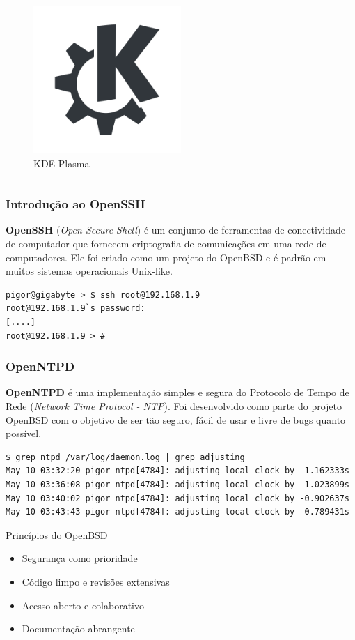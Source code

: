 \documentclass[9pt,xcolor=table]{beamer}
\begin{document}
\begin{frame}
\begin{columns}
\begin{column}{0.3\textwidth}
\begin{figure}
\centering
\includegraphics[width=0.5\textwidth]{imagens/kde-logo.png}
\caption{KDE Plasma}
\end{figure}
\end{column}
\end{columns}
\end{frame}
\begin{frame}[fragile]
\frametitle{Introdução ao OpenSSH}
\textbf{OpenSSH} (\textit{Open Secure Shell}) é um conjunto de ferramentas de conectividade de computador que fornecem criptografia de comunicações em uma rede de computadores. Ele foi criado como um projeto do OpenBSD e é padrão em muitos sistemas operacionais Unix-like.
\vspace{0.5cm}
\begin{lstlisting}
pigor@gigabyte > $ ssh root@192.168.1.9
root@192.168.1.9`s password:
[....]
root@192.168.1.9 > #
\end{lstlisting}
\end{frame}
\begin{frame}[fragile]
\frametitle{OpenNTPD}
\justifying
\textbf{OpenNTPD} é uma implementação simples e segura do Protocolo de Tempo de Rede (\textit{Network Time Protocol - NTP}). Foi desenvolvido como parte do projeto OpenBSD com o objetivo de ser tão seguro, fácil de usar e livre de bugs quanto possível.
\vspace{0.5cm}
\begin{lstlisting}
$ grep ntpd /var/log/daemon.log | grep adjusting
May 10 03:32:20 pigor ntpd[4784]: adjusting local clock by -1.162333s
May 10 03:36:08 pigor ntpd[4784]: adjusting local clock by -1.023899s
May 10 03:40:02 pigor ntpd[4784]: adjusting local clock by -0.902637s
May 10 03:43:43 pigor ntpd[4784]: adjusting local clock by -0.789431s
\end{lstlisting}
\end{frame}
\begin{frame}{Princípios do OpenBSD}
  \begin{itemize}
    \item Segurança como prioridade
    \item Código limpo e revisões extensivas
    \item Acesso aberto e colaborativo
    \item Documentação abrangente
  \end{itemize}
\end{frame}
\end{document}

